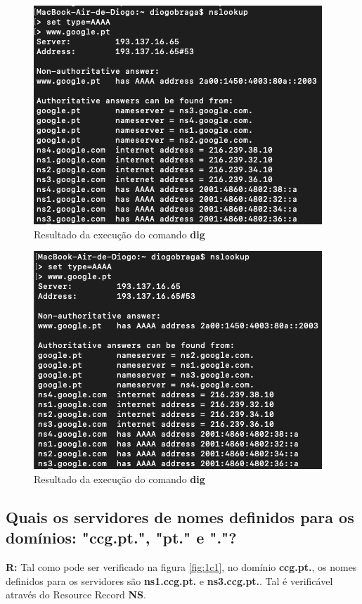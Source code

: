 \documentclass{llncs}
\begin{document}
\begin{figure}[H]
\begin{center}
\includegraphics[scale=0.4]{1b1.png}
\end{center}
\caption{\label{fig:1b1}Resultado da execução do comando \textbf{dig}}
\end{figure}

\begin{figure}[H]
\begin{center}
\includegraphics[scale=0.4]{1b2.png}
\end{center}
\caption{\label{fig:1b2}Resultado da execução do comando \textbf{dig}}
\end{figure}

\subsection{\textbf{Quais os servidores de nomes definidos para os domínios: "ccg.pt.", "pt." e "."?}}
\textbf{R:} Tal como pode ser verificado na figura \ref{fig:1c1}, no domínio \textbf{ccg.pt.}, os nomes definidos para os servidores são \textbf{ns1.ccg.pt.} e \textbf{ns3.ccg.pt.}. Tal é verificável através do Resource Record \textbf{NS}.
\end{document}
